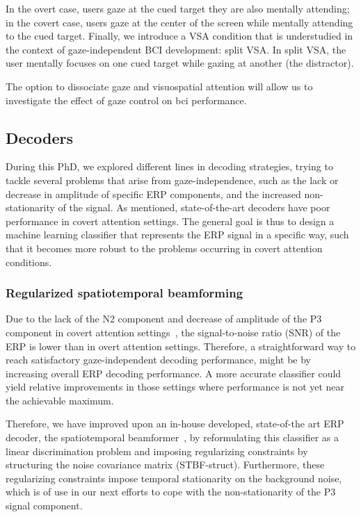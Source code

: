 In the overt case, users gaze at the cued
target they are also mentally attending; in the covert case, users
gaze at the center of the screen while mentally attending to the cued target.
Finally, we introduce a VSA condition that is understudied in the context of
gaze-independent BCI development: split VSA.
In split VSA, the user mentally focuses on one cued target while gazing at
another (the distractor).

The option to dissociate gaze and visuospatial attention will allow us to
investigate the effect of gaze control on \ac{bci} performance.

\subsection{Decoders}

During this PhD, we explored different lines in decoding strategies,
trying to tackle several problems that arise from gaze-independence, such as
the lack or decrease in amplitude of specific ERP components, and the increased
non-stationarity of the signal.
As mentioned, state-of-the-art decoders have poor performance in covert attention
settings.
The general goal is thus to design a machine learning classifier that represents
the ERP signal in a specific way, such that it becomes more robust to the problems
occurring in covert attention conditions.

\subsubsection{Regularized spatiotemporal beamforming}
Due to the lack of the N2 component and decrease of amplitude of the
P3 component in covert attention
settings~\cite{Treder2010}, the signal-to-noise ratio (SNR) of
the ERP is lower than in overt attention settings.
Therefore, a straightforward way to reach satisfactory
gaze-independent decoding performance, might be by increasing overall ERP
decoding performance. A more accurate classifier could yield relative
improvements in those settings where performance is not yet near the achievable
maximum.

Therefore, we have improved upon an in-house developed, state-of-the art ERP
decoder, the spatiotemporal beamformer~\cite{Wittevrongel2016}, by reformulating
this classifier as a linear discrimination problem and
imposing regularizing constraints by structuring the noise covariance matrix
(STBF-struct).
Furthermore, these regularizing constraints impose temporal stationarity on
the background noise, which is of use in our next efforts to cope with the
non-stationarity of the P3 signal component.

